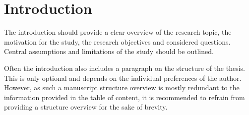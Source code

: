 \chapter{Introduction}
\label{cha:introduction}

The introduction should provide a clear overview of the research topic, the motivation for the study, the research objectives and considered questions. Central assumptions and limitations of the study should be outlined. 

Often the introduction also includes a paragraph on the structure of the thesis. This is only optional and depends on the individual preferences of the author. However, as such a manuscript structure overview is mostly redundant to the information provided in the table of content, it is recommended to refrain from providing a structure overview for the sake of brevity.


